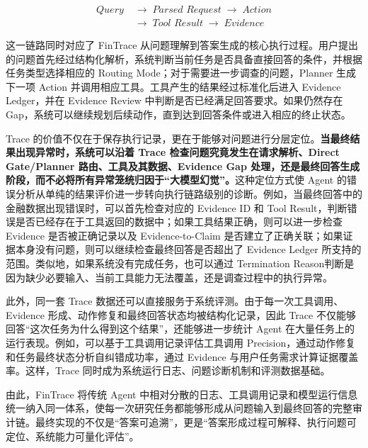 \[
\begin{aligned}
\textit{Query}
&\;\rightarrow\;
\textit{Parsed Request}
\;\rightarrow\;
\textit{Action} \\
&\;\rightarrow\;
\textit{Tool Result}
\;\rightarrow\;
\textit{Evidence}
\end{aligned}
\]

这一链路同时对应了 FinTrace 从问题理解到答案生成的核心执行过程。用户提出的问题首先经过结构化解析，系统判断当前任务是否具备直接回答的条件，并根据任务类型选择相应的 Routing Mode；对于需要进一步调查的问题，Planner 生成下一项 Action 并调用相应工具。工具产生的结果经过标准化后进入 Evidence Ledger，并在 Evidence Review 中判断是否已经满足回答要求。如果仍然存在Gap，系统可以继续规划后续动作，直到达到回答条件或进入相应的终止状态。

Trace 的价值不仅在于保存执行记录，更在于能够对问题进行分层定位。\textbf{当最终结果出现异常时，系统可以沿着 Trace 检查问题究竟发生在请求解析、Direct Gate/Planner 路由、工具及其数据、Evidence Gap 处理，还是最终回答生成阶段，而不必将所有异常笼统归因于“大模型幻觉”。}这种定位方式使 Agent 的错误分析从单纯的结果评价进一步转向执行链路级别的诊断。例如，当最终回答中的金融数据出现错误时，可以首先检查对应的 Evidence ID 和 Tool Result，判断错误是否已经存在于工具返回的数据中；如果工具结果正确，则可以进一步检查 Evidence 是否被正确记录以及 Evidence-to-Claim 是否建立了正确关联；如果证据本身没有问题，则可以继续检查最终回答是否超出了 Evidence Ledger 所支持的范围。类似地，如果系统没有完成任务，也可以通过 Termination Reason判断是因为缺少必要输入、当前工具能力无法覆盖，还是调查过程中的执行异常。

此外，同一套 Trace 数据还可以直接服务于系统评测。由于每一次工具调用、Evidence 形成、动作修复和最终回答状态均被结构化记录，因此 Trace 不仅能够回答“这次任务为什么得到这个结果”，还能够进一步统计 Agent 在大量任务上的运行表现。例如，可以基于工具调用记录评估工具调用 Precision，通过动作修复和任务最终状态分析自纠错成功率，通过 Evidence 与用户任务需求计算证据覆盖率。这样，Trace 同时成为系统运行日志、问题诊断机制和评测数据基础。

由此，FinTrace 将传统 Agent 中相对分散的日志、工具调用记录和模型运行信息统一纳入同一体系，使每一次研究任务都能够形成从问题输入到最终回答的完整审计链。最终实现的不仅是“答案可追溯”，更是“答案形成过程可解释、执行问题可定位、系统能力可量化评估”。
